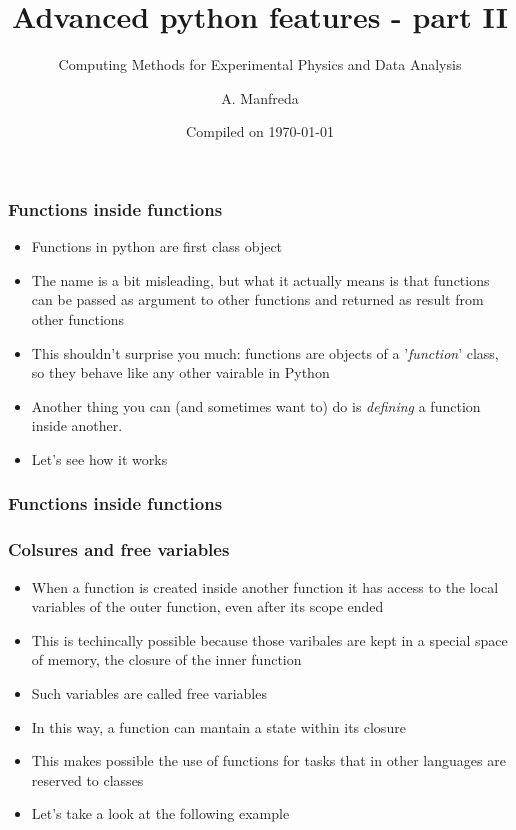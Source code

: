 \documentclass[9pt]{beamer}
\title{Advanced python features - part II}
\subtitle{Computing Methods for Experimental Physics and Data Analysis}
\date{Compiled on \today}
\author{A. Manfreda}
\institute[INFN]{INFN--Pisa}
\begin{document}
\titleframe


\begin{frame}
  \frametitle{Functions inside functions}
  \begin{itemize}
    \item Functions in python are \alert{first class object}
    \item The name is a bit misleading, but what it actually means is that functions
          can be passed as argument to other functions and returned as result from
          other functions
    \item This shouldn't surprise you much: functions are objects of a
          '\emph{function}' class, so they behave like any other vairable in
          Python
    \item Another thing you can (and sometimes want to) do is \emph{defining} a
          function inside another.
    \item Let's see how it works
  \end{itemize}
  
\end{frame}


\begin{frame}
  \frametitle{Functions inside functions}
  
\end{frame}


\begin{frame}
  \frametitle{Colsures and free variables}
  \begin{itemize}
    \item When a function is created inside another function it has access to
          the local variables of the outer function, even after its scope ended
    \smallskip
    \item This is techincally possible because those varibales are kept in a special
          space of memory, the \alert{closure} of the inner function
    \smallskip
    \item Such variables are called \alert{free variables}
    \smallskip
    \item In this way, a function can mantain a \alert{state} within its closure
    \smallskip
    \item This makes possible the use of functions for tasks that in other
          languages are reserved to classes
    \smallskip
    \item Let's take a look at the following example
  \end{itemize}
\end{frame}
\end{document}
